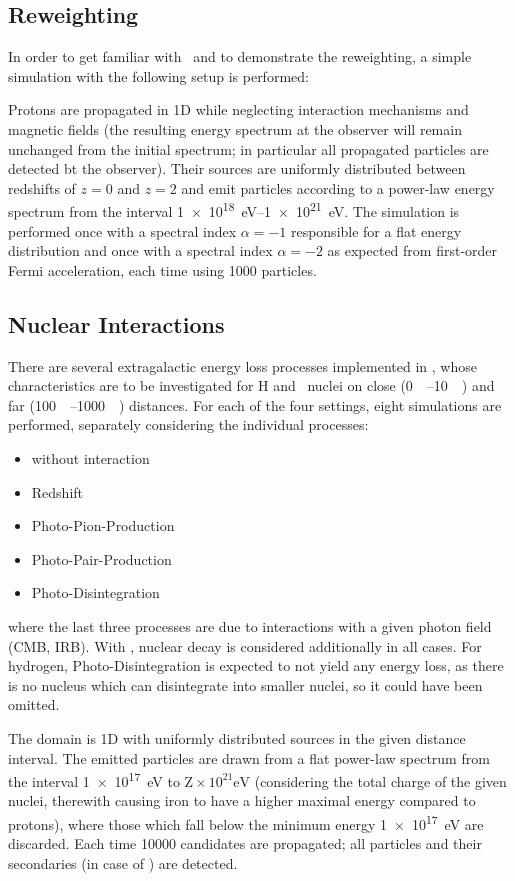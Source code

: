 \subsection{Reweighting}
In order to get familiar with \CRPropa~and to demonstrate the reweighting, a
simple simulation with the following setup is performed:

Protons are propagated in 1D while neglecting interaction mechanisms and
magnetic fields (the resulting energy spectrum at the observer will remain
unchanged from the initial spectrum; in particular all propagated particles
are detected bt the observer). Their sources are uniformly distributed
between redshifts of $z=0$ and $z=2$ and emit particles according to a
power-law energy spectrum from the interval \SIrange{1e18}{1e21}{\eV}. The
simulation is performed once with a spectral index $\alpha=-1$ responsible for
a flat energy distribution and once with a spectral index $\alpha=-2$ as
expected from first-order Fermi acceleration, each time using \num{1000}
particles.


\subsection{Nuclear Interactions}
There are several extragalactic energy loss processes implemented in
\CRPropa, whose characteristics are to be investigated for H and \Fe~nuclei on
close (\SIrange{0}{10}{\mega\parsec}) and far
(\SIrange{100}{1000}{\mega\parsec}) distances. For each of the four settings,
eight simulations are performed, separately considering the individual
processes:
\begin{itemize}
    \item without interaction
    \item Redshift
    \item Photo-Pion-Production
    \item Photo-Pair-Production
    \item Photo-Disintegration
\end{itemize}
where the last three processes are due to interactions with a given photon
field (CMB, IRB). With \Fe, nuclear decay is considered additionally in all
cases.
For hydrogen, Photo-Disintegration is expected to not yield any energy loss, as
there is no nucleus which can disintegrate into smaller nuclei, so it could
have been omitted.

The domain is 1D with uniformly distributed sources in the given distance
interval.
The emitted particles are drawn from a flat power-law spectrum from the
interval \SI{1e17}{\eV} to $\text{Z}\times10^{21}\si{\eV}$ (considering the
total charge of the given nuclei, therewith causing iron to have a higher
maximal energy compared to protons), where those which fall below the minimum
energy \SI{1e17}{\eV} are discarded. Each time \num{10000} candidates are
propagated; all particles and their secondaries (in case of \Fe) are detected.


